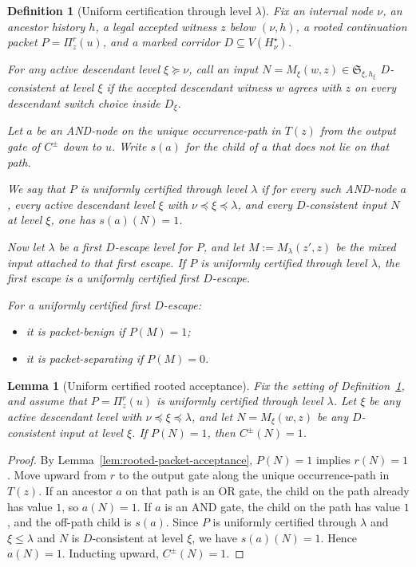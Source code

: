 \documentclass[11pt]{article}
\newtheorem{lemma}[theorem]{Lemma}
\newtheorem{definition}[theorem]{Definition}
\begin{document}
\begin{definition}[Uniform certification through level $\lambda$]
\label{def:uniform-certification}
Fix an internal node $\nu$, an ancestor history $h$, a legal accepted
witness $z$ below $(\nu,h)$, a rooted continuation packet
$P = \Pi^r_z(u)$, and a marked corridor $D \subseteq V(H^\star_\nu)$.

For any active descendant level $\xi \succeq \nu$, call an input
$N = M_\xi(w,z) \in \mathfrak{S}_{\xi,h_\xi}$ \emph{$D$-consistent at
level $\xi$} if the accepted descendant witness $w$ agrees with $z$ on
every descendant switch choice inside $D_\xi$.

Let $a$ be an AND-node on the unique occurrence-path in $T(z)$ from the
output gate of $C^\pm$ down to $u$.  Write $s(a)$ for the child of $a$
that does not lie on that path.

We say that $P$ is \emph{uniformly certified through level $\lambda$} if
for every such AND-node $a$, every active descendant level $\xi$ with
$\nu \preceq \xi \preceq \lambda$, and every $D$-consistent input $N$
at level $\xi$, one has $s(a)(N) = 1$.

Now let $\lambda$ be a first $D$-escape level for $P$, and let
$M := M_\lambda(z',z)$ be the mixed input attached to that first escape.
If $P$ is uniformly certified through level $\lambda$, the first escape
is a \emph{uniformly certified first $D$-escape}.

For a uniformly certified first $D$-escape:
\begin{itemize}
\item it is \emph{packet-benign} if $P(M) = 1$;
\item it is \emph{packet-separating} if $P(M) = 0$.
\end{itemize}
\end{definition}

\begin{lemma}[Uniform certified rooted acceptance]
\label{lem:uniform-certified-acceptance}
Fix the setting of Definition~\ref{def:uniform-certification}, and assume
that $P = \Pi^r_z(u)$ is uniformly certified through level $\lambda$.
Let $\xi$ be any active descendant level with $\nu \preceq \xi \preceq
\lambda$, and let $N = M_\xi(w,z)$ be any $D$-consistent input at level
$\xi$.  If $P(N) = 1$, then $C^\pm(N) = 1$.
\end{lemma}

\begin{proof}
By Lemma~\ref{lem:rooted-packet-acceptance}, $P(N) = 1$ implies
$r(N) = 1$.  Move upward from $r$ to the output gate along the unique
occurrence-path in $T(z)$.  If an ancestor $a$ on that path is an OR
gate, the child on the path already has value $1$, so $a(N) = 1$.  If
$a$ is an AND gate, the child on the path has value $1$, and the
off-path child is $s(a)$.  Since $P$ is uniformly certified through
$\lambda$ and $\xi \le \lambda$ and $N$ is $D$-consistent at level
$\xi$, we have $s(a)(N) = 1$.  Hence $a(N) = 1$.  Inducting upward,
$C^\pm(N) = 1$.
\end{proof}
\end{document}
